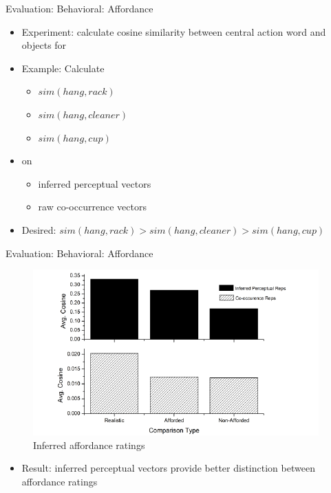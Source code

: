 \documentclass[12pt,a4paper]{beamer}
\begin{document}
\begin{frame}{Evaluation: Behavioral: Affordance}
\begin{itemize}
\item Experiment: calculate cosine similarity between central action word and objects for
\item Example: Calculate
    \begin{itemize}
    \item $sim(hang,rack)$
    \item $sim(hang,cleaner)$
    \item $sim(hang,cup)$
    \end{itemize}
\item on
    \begin{itemize}
    \item inferred perceptual vectors
    \item raw co-occurrence vectors
    \end{itemize}
\item Desired: $sim(hang,rack) > sim(hang,cleaner) > sim(hang,cup)$
\end{itemize}
\end{frame}



\begin{frame}{Evaluation: Behavioral: Affordance}
\begin{figure}
\includegraphics[scale=0.7]{figure_3_affordance_distinction.png}
\caption{Inferred affordance ratings}
\end{figure}
\begin{itemize}
\item Result: inferred perceptual vectors provide better distinction between affordance ratings
\end{itemize}
\end{frame}
\end{document}

